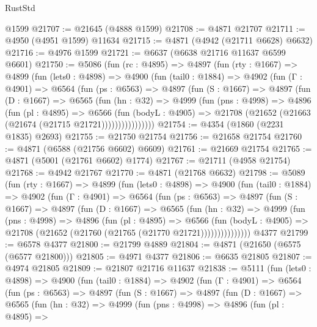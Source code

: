 \begin{lexlean}{RustStd}
\begin{coremodule}
{\begin{coremodule}
{{{{{{{{{{{{{{{{{{{{{{{{{{{{{    @1599
@21707 := @21645 (@4888 @1599)
@21708 := @4871 @21707
@21711 := @4950 (@4951 @1599) @11634
@21715 := @4871 (@4942 (@21711 @6628) @6632)
@21716 := @4976 @1599
@21721 := @6637 (@6638 @21716 @11637 @6599 @6601)
@21750 := @5086
    (fun (rc : @4895) =>
    @4897
      (fun (rty : @1667) =>
      @4899
        (fun (lets0 : @4898) =>
        @4900
          (fun (tail0 : @1884) =>
          @4902
            (fun (Γ : @4901) =>
            @6564
              (fun (ps : @6563) =>
              @4897
                (fun (S : @1667) =>
                @4897
                  (fun (D : @1667) =>
                  @6565
                    (fun (hn : @32) =>
                    @4999
                      (fun (pns : @4998) =>
                      @4896
                        (fun (pl : @4895) =>
                        @6566
                          (fun (bodyL : @4905) =>
                          @21708 (@21652 (@21663 (@21674 (@21715 @21721))))))))))))))))
@21754 := @4354 (@1860 (@2231 @1835) @2693)
@21755 := @21750 @21754
@21756 := @21658 @21754
@21760 := @4871 (@6588 (@21756 @6602) @6609)
@21761 := @21669 @21754
@21765 := @4871 (@5001 (@21761 @6602) @1774)
@21767 := @21711 (@4958 @21754)
@21768 := @4942 @21767
@21770 := @4871 (@21768 @6632)
@21798 := @5089
    (fun (rty : @1667) =>
    @4899
      (fun (lets0 : @4898) =>
      @4900
        (fun (tail0 : @1884) =>
        @4902
          (fun (Γ : @4901) =>
          @6564
            (fun (ps : @6563) =>
            @4897
              (fun (S : @1667) =>
              @4897
                (fun (D : @1667) =>
                @6565
                  (fun (hn : @32) =>
                  @4999
                    (fun (pns : @4998) =>
                    @4896
                      (fun (pl : @4895) =>
                      @6566
                        (fun (bodyL : @4905) =>
                        @21708 (@21652 (@21760 (@21765 (@21770 @21721)))))))))))))))
    @4377
@21799 := @6578 @4377
@21800 := @21799 @4889
@21804 := @4871 (@21650 (@6575 (@6577 @21800)))
@21805 := @4971 @4377
@21806 := @6635 @21805
@21807 := @4974 @21805
@21809 := @21807 @21716 @11637
@21838 := @5111
    (fun (lets0 : @4898) =>
    @4900
      (fun (tail0 : @1884) =>
      @4902
        (fun (Γ : @4901) =>
        @6564
          (fun (ps : @6563) =>
          @4897
            (fun (S : @1667) =>
            @4897
              (fun (D : @1667) =>
              @6565
                (fun (hn : @32) =>
                @4999
                  (fun (pns : @4998) =>
                  @4896
                    (fun (pl : @4895) =>
}}}}}}}}}}}}}}}}}}}}}}}}}}}}}
\end{coremodule}}
\end{coremodule}
\end{lexlean}
